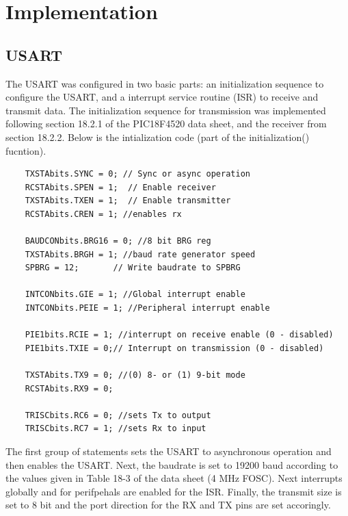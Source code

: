 \documentclass[12pt]{article}
\begin{document}
\section{Implementation}
\subsection*{\normalsize USART}
The USART was configured in two basic parts: an initialization sequence to configure the USART, and a interrupt service routine (ISR) to receive and transmit data. The initialization sequence for transmission was implemented following section 18.2.1 of the PIC18F4520 data sheet, and the receiver from section 18.2.2. Below is the intialization code (part of the initialization() fucntion).
\begin{lstlisting}
	TXSTAbits.SYNC = 0;	// Sync or async operation
	RCSTAbits.SPEN = 1;  // Enable receiver
	TXSTAbits.TXEN = 1;  // Enable transmitter
	RCSTAbits.CREN = 1; //enables rx

	BAUDCONbits.BRG16 = 0; //8 bit BRG reg
	TXSTAbits.BRGH = 1; //baud rate generator speed
	SPBRG = 12;       // Write baudrate to SPBRG

	INTCONbits.GIE = 1; //Global interrupt enable
	INTCONbits.PEIE = 1; //Peripheral interrupt enable

	PIE1bits.RCIE = 1; //interrupt on receive enable (0 - disabled)
	PIE1bits.TXIE = 0;// Interrupt on transmission (0 - disabled)

	TXSTAbits.TX9 = 0; //(0) 8- or (1) 9-bit mode
	RCSTAbits.RX9 = 0;

	TRISCbits.RC6 = 0; //sets Tx to output
	TRISCbits.RC7 = 1; //sets Rx to input
\end{lstlisting}
The first group of statements sets the USART to asynchronous operation and then enables the USART. Next, the baudrate is set to 19200 baud according to the values given in Table 18-3 of the data sheet (4 MHz FOSC). Next interrupts globally and for perifpehals are enabled for the ISR. Finally, the transmit size is set to 8 bit and the port direction for the RX and TX pins are set accoringly. \\\par
\end{document}

